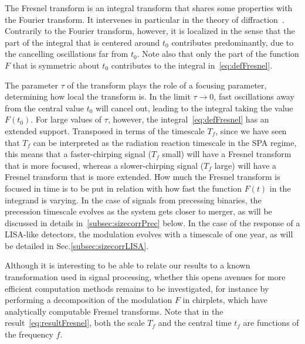 \documentclass[aps,showpacs,%
prd,superscriptaddress,nofootinbib]{revtex4}
\newcommand{\tf}{t_{f}}
\newcommand{\Tf}{T_{f}}
\begin{document}
The Fresnel transform is an integral transform that shares some properties with the Fourier transform. It intervenes in particular in the theory of diffraction~\cite{}. Contrarily to the Fourier transform, however, it is localized in the sense that the part of the integral that is centered around $t_{0}$ contributes predominantly, due to the cancelling oscillations far from $t_{0}$. Note also that only the part of the function $F$ that is symmetric about $t_{0}$ contributes to the integral in~\eqref{eq:defFresnel}.

The parameter $\tau$ of the transform plays the role of a focusing parameter, determining how local the transform is. In the limit $\tau\rightarrow 0$, fast oscillations away from the central value $t_{0}$ will cancel out, leading to the integral taking the value $F(t_{0})$. For large values of $\tau$, however, the integral~\eqref{eq:defFresnel} has an extended support. Transposed in terms of the timescale $\Tf$, since we have seen that $\Tf$ can be interpreted as the radiation reaction timescale in the SPA regime, this means that a faster-chirping signal ($\Tf$ small) will have a Fresnel transform that is more focused, whereas a slower-chirping signal ($\Tf$ large) will have a Fresnel transform that is more extended. How much the Fresnel transform is focused in time is to be put in relation with how fast the function $F(t)$ in the integrand is varying. In the case of signals from precessing binaries, the precession timescale evolves as the system gets closer to merger, as will be discussed in details in~\ref{subsec:sizecorrPrec} below. In the case of the response of a LISA-like detectors, the modulation evolves with a timescale of one year, as will be detailed in Sec.\ref{subsec:sizecorrLISA}.

Although it is interesting to be able to relate our results to a known transformation used in signal processing, whether this opens avenues for more efficient computation methods remains to be investigated, for instance by performing a decomposition of the modulation $F$ in chirplets, which have analytically computable Fresnel transforms. Note that in the result~\eqref{eq:resultFresnel}, both the scale $\Tf$ and the central time $\tf$ are functions of the frequency $f$.
\end{document}
